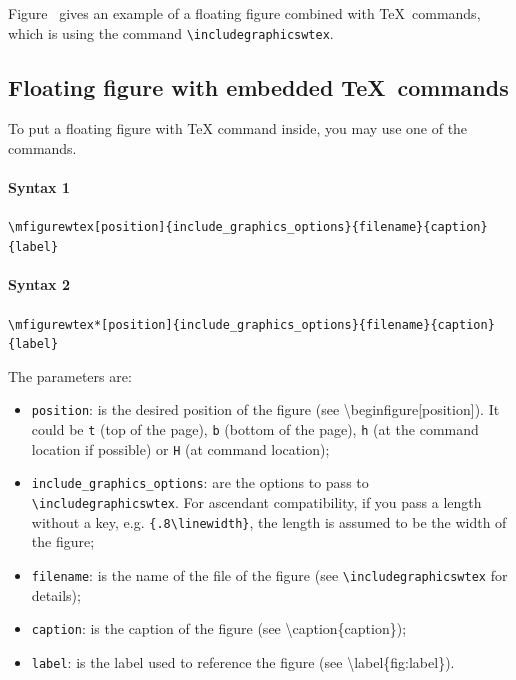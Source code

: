 \documentclass[book,taskpackage,specpackage,codepackage]{upmethodology-document}
\begin{document}
Figure~ gives an example of a floating figure combined with \TeX\ commands, which is using the command \texttt{{\textbackslash}includegraphicswtex}.

\subsection{Floating figure with embedded \TeX\ commands}

To put a floating figure with \TeX\xspace command inside, you may use one of the commands.

\paragraph{Syntax 1} \texttt{{\textbackslash}mfigurewtex[position]\{include\_graphics\_options\}\{filename\}\{caption\}\{label\}}

\paragraph{Syntax 2} \texttt{{\textbackslash}mfigurewtex*[position]\{include\_graphics\_options\}\{filename\}\{caption\}\{label\}}

The parameters are:
\begin{itemize}
\item \texttt{position}: is the desired position of the figure (see {\textbackslash}begin{figure}[position]). It could be \texttt{t} (top of the page), \texttt{b} (bottom of the page), \texttt{h} (at the command location if possible) or \texttt{H} (at command location);

\item \texttt{include\_graphics\_options}: are the options to pass to \texttt{{\textbackslash}includegraphicswtex}. For ascendant compatibility, if you pass a length without a key, e.g. \texttt{\{.8{\textbackslash}linewidth\}}, the length is assumed to be the width of the figure;

\item \texttt{filename}: is the name of the file of the figure (see \texttt{{\textbackslash}includegraphicswtex} for details);

\item \texttt{caption}: is the caption of the figure (see {\textbackslash}caption\{caption\});

\item \texttt{label}: is the label used to reference the figure (see {\textbackslash}label\{fig:label\}).
\end{itemize}
\end{document}
